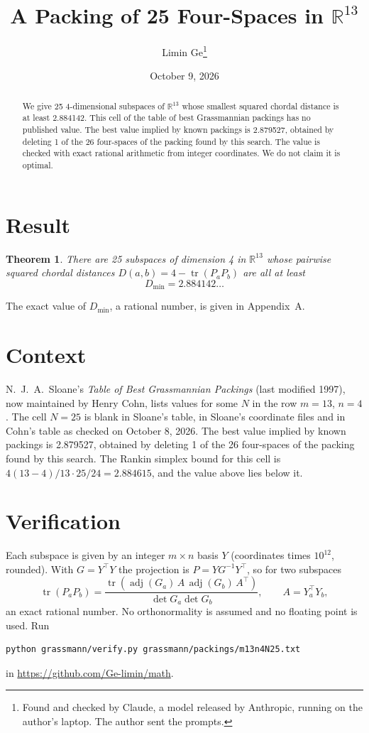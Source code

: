 \documentclass[11pt,a4paper]{article}
\title{A Packing of 25 Four-Spaces in $\mathbb{R}^{13}$}
\author{Limin Ge\thanks{Found and checked by Claude, a model released by Anthropic, running on the author's laptop. The author sent the prompts.}}
\date{October 9, 2026}
\newtheorem*{theorem}{Theorem}
\begin{document}
\maketitle
\begin{abstract}
We give 25 4-dimensional subspaces of $\mathbb{R}^{13}$ whose smallest squared chordal distance is at least 2.884142. This cell of the table of best Grassmannian packings has no published value. The best value implied by known packings is 2.879527, obtained by deleting 1 of the 26 four-spaces of the packing found by this search. The value is checked with exact rational arithmetic from integer coordinates. We do not claim it is optimal.
\end{abstract}

\section{Result}
\begin{theorem}
There are 25 subspaces of dimension 4 in $\mathbb{R}^{13}$ whose pairwise squared chordal distances $D(a,b) = 4 - \operatorname{tr}(P_aP_b)$ are all at least
\[ D_{\min} = 2.884142\ldots \]
\end{theorem}
The exact value of $D_{\min}$, a rational number, is given in Appendix~A.


\section{Context}
N.~J.~A.~Sloane's \emph{Table of Best Grassmannian Packings} (last modified 1997), now maintained by Henry Cohn, lists values for some $N$ in the row $m=13$, $n=4$. The cell $N=25$ is blank in Sloane's table, in Sloane's coordinate files and in Cohn's table as checked on October 8, 2026. The best value implied by known packings is 2.879527, obtained by deleting 1 of the 26 four-spaces of the packing found by this search. The Rankin simplex bound for this cell is $4(13-4)/13\cdot 25/24 = 2.884615$, and the value above lies below it.


\section{Verification}
Each subspace is given by an integer $m\times n$ basis $Y$ (coordinates times $10^{12}$, rounded). With $G=Y^\top Y$ the projection is $P=YG^{-1}Y^\top$, so for two subspaces
\[ \operatorname{tr}(P_aP_b)=\frac{\operatorname{tr}(\operatorname{adj}(G_a)\,A\,\operatorname{adj}(G_b)\,A^\top)}{\det G_a\det G_b},\qquad A=Y_a^\top Y_b, \]
an exact rational number. No orthonormality is assumed and no floating point is used. Run
\begin{verbatim}
python grassmann/verify.py grassmann/packings/m13n4N25.txt
\end{verbatim}
in \url{https://github.com/Ge-limin/math}.
\end{document}
